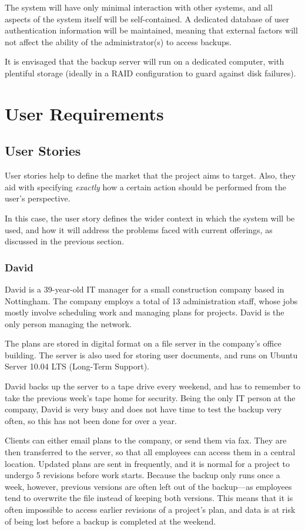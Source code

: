 The system will have only minimal interaction with other systems, and all
aspects of the system itself will be self-contained. A dedicated database of
user authentication information will be maintained, meaning that external
factors will not affect the ability of the administrator(s) to access backups.

It is envisaged that the backup server will run on a dedicated computer, with
plentiful storage (ideally in a RAID configuration to guard against disk
failures).

\section{User Requirements}

\subsection{User Stories}

User stories help to define the market that the project aims to target. Also,
they aid with specifying \emph{exactly} how a certain action should be
performed from the user's perspective.

In this case, the user story defines the wider context in which the system will
be used, and how it will address the problems faced with current offerings, as
discussed in the previous section.

\subsubsection{David}

David is a 39-year-old IT manager for a small construction company based in
Nottingham. The company employs a total of 13 administration staff, whose jobs
mostly involve scheduling work and managing plans for projects. David is the
only person managing the network.

The plans are stored in digital format on a file server in the company's office
building. The server is also used for storing user documents, and runs on
Ubuntu Server 10.04 LTS (Long-Term Support).

David backs up the server to a tape drive every weekend, and has to remember to
take the previous week's tape home for security. Being the only IT person at
the company, David is very busy and does not have time to test the backup very
often, so this has not been done for over a year.

Clients can either email plans to the company, or send them via fax. They are
then transferred to the server, so that all employees can access them in
a central location. Updated plans are sent in frequently, and it is normal for
a project to undergo 5 revisions before work starts. Because the backup only
runs once a week, however, previous versions are often left out of the
backup---as employees tend to overwrite the file instead of keeping both
versions. This means that it is often impossible to access earlier revisions of
a project's plan, and data is at risk of being lost before a backup is
completed at the weekend.

